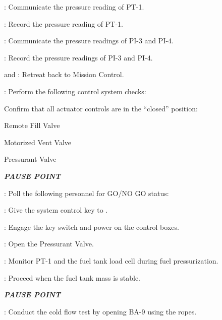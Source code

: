 \begin{checklist}
    \item \daq{}: Communicate the pressure reading of PT-1.
    \item \ops{}: Record the pressure reading of PT-1.
    \item \primary{}: Communicate the pressure readings of PI-3 and PI-4.
    \item \ops{}: Record the pressure readings of PI-3 and PI-4.
    \item \primary{} and \secondary{}: Retreat back to Mission Control.
    \item \control{}: Perform the following control system checks:
    \begin{checklist}
        \item Confirm that all actuator controls are in the ``closed'' position:
        \begin{checklist}
            \item Remote Fill Valve
            \item Motorized Vent Valve
            \item Pressurant Valve
        \end{checklist}
    \end{checklist}
    \item \textbf{\textit{PAUSE POINT}}
    \item \ops{}: Poll the following personnel for GO/NO GO status:
    \begin{checklist}
		\item \control{}
        \item \daq{}
        \item \primary{}
        \item \secondary{}
		\item \peri{}
		\item \perii{}
		\item \periii{}
    \end{checklist}
    \item \ops{}: Give the system control key to \control{}.
    \item \control{}: Engage the key switch and power on the control boxes.
    \item \control{}: Open the Pressurant Valve.
    \item \daq{}: Monitor PT-1 and the fuel tank load cell during fuel pressurization.
    \item \daq{}: Proceed when the fuel tank mass is stable.
    \item \textbf{\textit{PAUSE POINT}}
    \item \primary{}: Conduct the cold flow test by opening BA-9 using the ropes.

\end{checklist}
